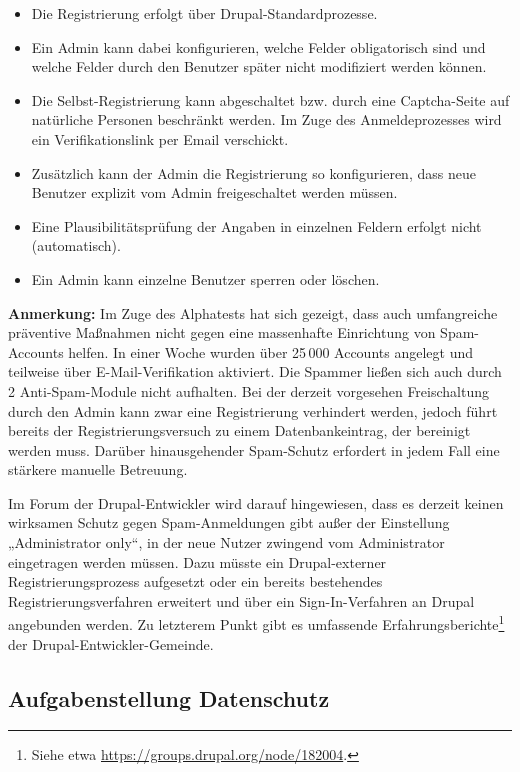 \documentclass[11pt,a4paper,twoside]{article}
\begin{document}
\begin{itemize}\itemsep0pt
\item Die Registrierung erfolgt über Drupal-Standardprozesse. 
\item Ein Admin kann dabei konfigurieren, welche Felder obligatorisch sind und
  welche Felder durch den Benutzer später nicht modifiziert werden können. 
\item Die Selbst-Registrierung kann abgeschaltet bzw. durch eine Captcha-Seite
  auf natürliche Personen beschränkt werden.  Im Zuge des Anmeldeprozesses wird
  ein Verifikationslink per Email verschickt.
\item Zusätzlich kann der Admin die Registrierung so konfigurieren, dass neue
  Benutzer explizit vom Admin freigeschaltet werden müssen. 
\item Eine Plausibilitätsprüfung der Angaben in einzelnen Feldern erfolgt
  nicht (automatisch). 
\item Ein Admin kann einzelne Benutzer sperren oder löschen. 
\end{itemize}

\textbf{Anmerkung:} Im Zuge des Alphatests hat sich gezeigt, dass auch
umfangreiche präventive Maßnahmen nicht gegen eine massenhafte Einrichtung von
Spam-Accounts helfen.  In einer Woche wurden über 25\,000 Accounts angelegt und
teilweise über E-Mail-Verifikation aktiviert. Die Spammer ließen sich auch
durch 2 Anti-Spam-Module nicht aufhalten.  Bei der derzeit vorgesehen
Freischaltung durch den Admin kann zwar eine Registrierung verhindert werden,
jedoch führt bereits der Registrierungsversuch zu einem Datenbankeintrag, der
bereinigt werden muss. Darüber hinausgehender Spam-Schutz erfordert in jedem
Fall eine stärkere manuelle Betreuung. 

Im Forum der Drupal-Entwickler wird darauf hingewiesen, dass es derzeit keinen
wirksamen Schutz gegen Spam-Anmeldungen gibt außer der Einstellung
„Administrator only“, in der neue Nutzer zwingend vom Administrator eingetragen
werden müssen. Dazu müsste ein Drupal-externer Registrierungsprozess aufgesetzt
oder ein bereits bestehendes Registrierungsverfahren erweitert und über ein
Sign-In-Verfahren an Drupal angebunden werden.  Zu letzterem Punkt gibt es
umfassende Erfahrungsberichte\footnote{Siehe etwa
  \url{https://groups.drupal.org/node/182004}.} der Drupal-Entwickler-Gemeinde.

\subsection*{Aufgabenstellung Datenschutz}
\end{document}
